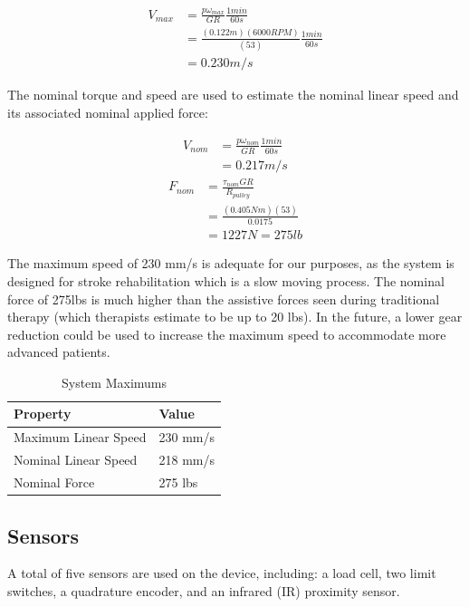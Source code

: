 \documentclass[12pt]{report}
\begin{document}
	\begin{align*}
		V_{max} &= \frac{p\omega _{max}}{GR} \frac{1min}{60s} \\
		&= \frac{(0.122m)(6000 RPM)}{(53)} \frac{1min}{60s} \\
		&= 0.230 m/s
	\end{align*}
	
	The nominal torque and speed are used to estimate the nominal linear speed and its associated nominal applied force:
	
	\begin{align*}
		V_{nom} &= \frac{p\omega _{nom}}{GR} \frac{1min}{60s} \\
		&= 0.217 m/s
	\end{align*}
	\begin{align*}
		F_{nom} &= \frac{\tau _{nom}GR}{R_{pulley}} \\
		&= \frac{(0.405Nm)(53)}{0.0175} \\
		&= 1227N = 275 lb
	\end{align*}

The maximum speed of 230 mm/s is adequate for our purposes, as the system is designed for stroke rehabilitation which is a slow moving process. The nominal force of 275lbs is much higher than the assistive forces seen during traditional therapy (which therapists estimate to be up to 20 lbs). In the future, a lower gear reduction could be used to increase the maximum speed to accommodate more advanced patients.

	\begin{table}[h]
	\centering
	\caption{System Maximums}	
	\begin{tabular}{|l|l|}
		\hline
		\rowcolor{gray!10} \textbf{Property} & \textbf{Value}  \\ \hline
 		Maximum Linear Speed & 230 mm/s \\ \hline
 		Nominal Linear Speed & 218 mm/s \\ \hline
 		Nominal Force & 275 lbs \\ \hline
		\end{tabular}
	\label{tab:gear}
	\end{table}		
		
		
		\subsection{Sensors}

	A total of five sensors are used on the device, including: a load cell, two limit switches, a quadrature encoder, and an infrared (IR) proximity sensor. 
	
\end{document}
